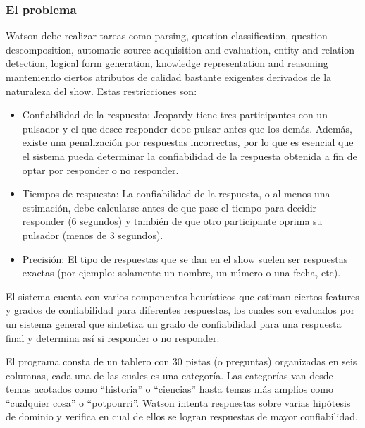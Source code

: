 \subsubsection*{El problema}

Watson debe realizar tareas como parsing, question classification,
question descomposition, automatic source adquisition and evaluation,
entity and relation detection, logical form generation, knowledge
representation and reasoning manteniendo ciertos atributos de calidad
bastante exigentes derivados de la naturaleza del show. Estas
restricciones son:

\begin{itemize}
\item Confiabilidad de la respuesta: \newline
Jeopardy tiene tres participantes con un pulsador y el que desee
responder debe pulsar antes que los demás. Además, existe una
penalización por respuestas incorrectas, por lo que es esencial que
el sistema pueda determinar la confiabilidad de la respuesta obtenida a
fin de optar por responder o no responder.
\item Tiempos de respuesta: \newline
La confiabilidad de la respuesta, o al menos una estimación, debe
calcularse antes de que pase el tiempo para decidir responder (6
segundos) y también de que otro participante oprima su pulsador
(menos de 3 segundos).
\item Precisión:\newline
El tipo de respuestas que se dan en el show suelen ser respuestas
exactas (por ejemplo: solamente un nombre, un número o una fecha,
etc). 
\end{itemize}

\bigskip

El sistema cuenta con varios componentes heurísticos que estiman
ciertos features y grados de confiabilidad para diferentes respuestas,
los cuales son evaluados por un sistema general que sintetiza un grado
de confiabilidad para una respuesta final y determina así si
responder o no responder. 

El programa consta de un tablero con 30 pistas (o preguntas) organizadas
en seis columnas, cada una de las cuales es una categoría. Las
categorías van desde temas acotados como
{\textquotedblleft}historia{\textquotedblright} o
{\textquotedblleft}ciencias{\textquotedblright} hasta temas más
amplios como {\textquotedblleft}cualquier cosa{\textquotedblright} o
{\textquotedblleft}potpourri{\textquotedblright}. Watson intenta
respuestas sobre varias hipótesis de dominio y verifica en cual de
ellos se logran respuestas de mayor confiabilidad. 


